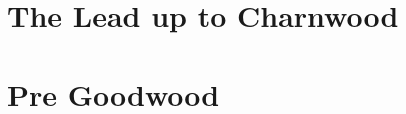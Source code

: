 \documentclass[noraggedright]{turabian-researchpaper}
\begin{document}

\section{The Lead up to Charnwood}












\section{Pre Goodwood}



\end{document}
